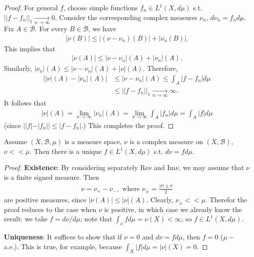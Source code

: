 \begin{proof}
    For general \(f\), choose simple functions \(f_n\in L^1(X,d\mu)\) s.t. \(||f-f_n||_1\xrightarrow[n\rightarrow\infty]{ }0\). Consider the corresponding complex measures \(\nu_n\), \(d\nu_n = f_nd\mu\). Fix \(A\in\mathscr{B}\). For every \(B\in\mathscr{B}\), we have
    \begin{align*}
        |\nu(B)| \leq |(\nu - \nu_n)(B)| + |\nu_n(B)|.
    \end{align*}
    This implies that 
    \begin{align*}
        |\nu(A)| \leq |\nu-\nu_n |(A) + |\nu_n|(A).
    \end{align*}
    Similarly, \(|\nu_n|(A)\leq|\nu-\nu_n|(A) + |\nu|(A)\). Therefore,
    \begin{align*}
        \Big\vert|\nu|(A) - |\nu_n|(A) \Big\vert &\leq |\nu-\nu_n|(A) \leq \int_A |f-f_n|d\mu \\
        &\leq ||f-f_n||_1\xrightarrow[n\rightarrow\infty]{ }\infty.
    \end{align*}
    It follows that
    \begin{align*}
        |\nu|(A) = \lim\limits_{n\rightarrow\infty}|\nu_n|(A) = \lim\limits_{n\rightarrow\infty}\int_A|f_n|d\mu = \int_A|f|d\mu 
    \end{align*}
    (since \(||f|-|f_n|| \leq |f - f_n|\).) This completes the proof.
\end{proof}
\fi
\begin{theorem}
    Assume \((X,\mathscr{B}, \mu)\) is a measure space, \(\nu\) is a complex measure on \((X,\mathscr{B})\), \(\nu<<\mu\). Then there is a unique \(f\in L^1(X,d\mu)\) s.t. \(d\nu = fd\mu\).
\end{theorem}
\ifdetailed
\begin{proof}
    \textbf{Existence}: By considering separately Re\(\nu\) and Im\(\nu\), we may assume that \(\nu\) is a finite signed measure. Then 
    \begin{align*}
        \nu = \nu_{+} - \nu_{-}, \text{ where } \nu_{\pm} = \frac{|\nu|\pm\nu}{2}
    \end{align*}
    are positive measures, since \(|\nu(A)| \leq |\nu|(A)\). Clearly, \(\nu_{\pm}<<\mu\). Therefor the proof reduces to the case when \(\nu\) is positive, in which case we already know the result: we take \(f=d\nu/d\mu\); note that \(\int_x fd\mu=\nu(X)<\infty\), so \(f\in L^1(X,d\mu)\).

    \textbf{Uniqueness}: It suffices to show that if \(\nu=0\) and \(d\nu=fd\mu\), then \(f=0\) (\(\mu-\)a.e.). This is true, for example, because \(\int_X|f|d\mu = |\nu|(X)=0\).
\end{proof}
\fi 